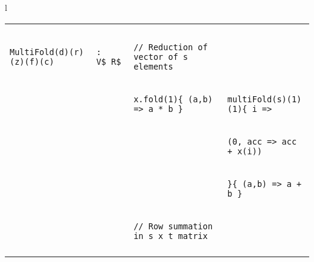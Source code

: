 \begin{figure*}
\begin{tabular}{l}
{\begin{tabular}{ll|l|l}
{} & {} & {} & {} \\ \arrayrulecolor[gray]{0.8}\hline
\vspace{-0.25cm}
{} & {} & {} & {} \\
\vspace{-0.075cm}

{\begin{lstlisting}[numbers=none,mathescape=true]
MultiFold(d)(r)(z)(f)(c)
\end{lstlisting}} &
{\begin{lstlisting}[numbers=none,mathescape=true]
: V$_R$
\end{lstlisting}} &
{\begin{lstlisting}[numbers=none,mathescape=true]
// Reduction of vector of s elements
\end{lstlisting}} & {} \\
\vspace{-0.075cm}

{} & {} & {\begin{lstlisting}[numbers=none,mathescape=true]
x.fold(1){ (a,b) => a * b }
\end{lstlisting}} &
{\begin{lstlisting}[numbers=none,mathescape=true]
multiFold(s)(1)(1){ i =>
\end{lstlisting}} \\
\vspace{-0.075cm}

{} & {} & {\begin{lstlisting}[numbers=none,mathescape=true]
\end{lstlisting}} &
{\begin{lstlisting}[numbers=none,mathescape=true]
  (0, acc => acc + x(i))
\end{lstlisting}} \\
\vspace{-0.075cm}

{} & {} & {\begin{lstlisting}[numbers=none,mathescape=true]
\end{lstlisting}} &
{\begin{lstlisting}[numbers=none,mathescape=true]
}{ (a,b) => a + b }
\end{lstlisting}} \\
\vspace{-0.075cm}

{} & {} & {\begin{lstlisting}[numbers=none,mathescape=true]
// Row summation in s x t matrix
\end{lstlisting}} & {} \\
\vspace{-0.075cm}


\end{tabular}}
\end{tabular}
\end{figure*}
